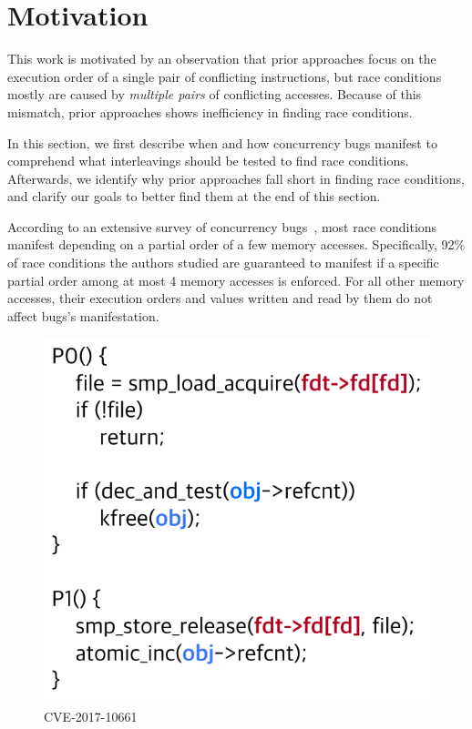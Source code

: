 \section{Motivation}
\label{ss:motivation}

This work is motivated by an observation that prior approaches
focus on the execution order of a single pair of conflicting
instructions, but race conditions mostly are caused by 
\textit{multiple pairs} of conflicting accesses.
%
Because of this mismatch, prior approaches shows
inefficiency in finding race conditions.

In this section, we first describe when and how concurrency bugs
manifest to comprehend what interleavings should be tested to find
race conditions.
%
Afterwards, we identify why prior approaches fall short in finding
race conditions, and clarify our goals to better find them at the end
of this section.




%
According to an extensive survey of concurrency
bugs~\cite{learningfrommistakes}, most race conditions manifest
depending on a partial order of a few memory accesses.
%
Specifically, 92\% of race conditions the authors studied are
guaranteed to manifest if a specific partial order among at most 4
memory accesses is enforced.
%
For all other memory accesses, their execution orders and values
written and read by them do not affect bugs's manifestation.

\begin{figure}
  \centering
  \includegraphics[width=0.9\linewidth]{fig/racecondition.pdf}
  \caption{CVE-2017-10661}
  \label{fig:cve-2017-10661}
\end{figure}

